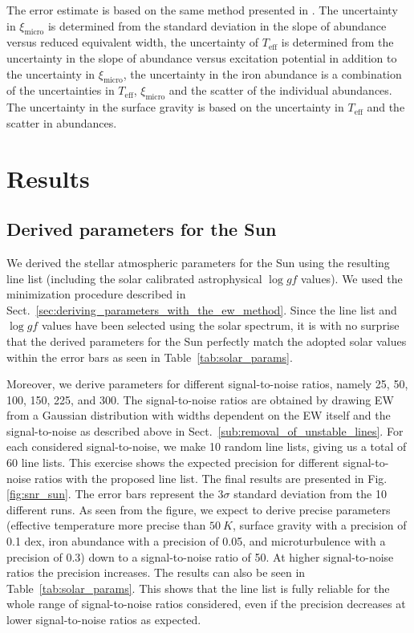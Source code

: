 \documentclass{aa}
\begin{document}
The error estimate is based on the same method presented in
\citet{Gonzalez1998}. The uncertainty in $\xi_\mathrm{micro}$ is
determined from the standard deviation in the slope of abundance
versus reduced equivalent width, the uncertainty of $T_\mathrm{eff}$
is determined from the uncertainty in the slope of abundance
versus excitation potential in addition to the uncertainty in
$\xi_\mathrm{micro}$, the uncertainty in the iron abundance
is a combination of the uncertainties in $T_\mathrm{eff}$,
$\xi_\mathrm{micro}$ and the scatter of the individual 
abundances. The uncertainty in the surface gravity is based on the
uncertainty in $T_\mathrm{eff}$ and the scatter in 
abundances.


\section{Results}
\label{sec:results}

\subsection{Derived parameters for the Sun}
\label{sec:derived_parameters_of_the_sun}

We derived the stellar atmospheric parameters for the Sun using the
resulting line list (including the solar calibrated astrophysical $\log
\mathit{gf}$ values). We used the minimization procedure described in
Sect.~\ref{sec:deriving_parameters_with_the_ew_method}. Since the line
list and $\log\mathit{gf}$ values have been selected using the solar
spectrum, it is with no surprise that the derived parameters for the Sun
perfectly match the adopted solar values within the error bars as seen
in Table~\ref{tab:solar_params}.

Moreover, we derive parameters for different signal-to-noise ratios,
namely 25, 50, 100, 150, 225, and 300. The signal-to-noise ratios
are obtained by drawing EW from a Gaussian distribution with widths
dependent on the EW itself and the signal-to-noise as described above
in Sect.~\ref{sub:removal_of_unstable_lines}. For each considered
signal-to-noise, we make 10 random line lists, giving us a total of 60
line lists. This exercise shows the expected precision for different
signal-to-noise ratios with the proposed line list. The final results
are presented in Fig.\ref{fig:snr_sun}. The error bars represent the
$3\sigma$ standard deviation from the 10 different runs. As seen
from the figure, we expect to derive precise parameters (effective
temperature more precise than $\SI{50}{K}$, surface gravity with a
precision of 0.1 dex, iron abundance with a precision of 0.05, and
microturbulence with a precision of 0.3) down to a signal-to-noise
ratio of 50. At higher signal-to-noise ratios the precision increases.
The results can also be seen in Table~\ref{tab:solar_params}. This
shows that the line list is fully reliable for the whole range of
signal-to-noise ratios considered, even if the precision decreases at
lower signal-to-noise ratios as expected.
\end{document}
